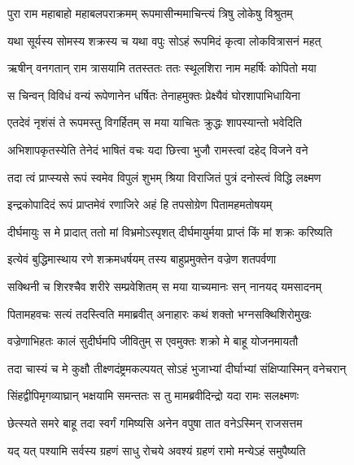 
\twolineshloka
{पुरा राम महाबाहो महाबलपराक्रमम्}
{रूपमासीन्ममाचिन्त्यं त्रिषु लोकेषु विश्रुतम्} %

\twolineshloka
{यथा सूर्यस्य सोमस्य शक्रस्य च यथा वपुः}
{सोऽहं रूपमिदं कृत्वा लोकवित्रासनं महत्} %

\twolineshloka
{ऋषीन् वनगतान् राम त्रासयामि ततस्ततः}
{ततः स्थूलशिरा नाम महर्षिः कोपितो मया} %

\twolineshloka
{स चिन्वन् विविधं वन्यं रूपेणानेन धर्षितः}
{तेनाहमुक्तः प्रेक्ष्यैवं घोरशापाभिधायिना} %

\twolineshloka
{एतदेवं नृशंसं ते रूपमस्तु विगर्हितम्}
{स मया याचितः क्रुद्धः शापस्यान्तो भवेदिति} %

\twolineshloka
{अभिशापकृतस्येति तेनेदं भाषितं वचः}
{यदा छित्त्वा भुजौ रामस्त्वां दहेद् विजने वने} %

\twolineshloka
{तदा त्वं प्राप्स्यसे रूपं स्वमेव विपुलं शुभम्}
{श्रिया विराजितं पुत्रं दनोस्त्वं विद्धि लक्ष्मण} %

\twolineshloka
{इन्द्रकोपादिदं रूपं प्राप्तमेवं रणाजिरे}
{अहं हि तपसोग्रेण पितामहमतोषयम्} %

\twolineshloka
{दीर्घमायुः स मे प्रादात् ततो मां विभ्रमोऽस्पृशत्}
{दीर्घमायुर्मया प्राप्तं किं मां शक्रः करिष्यति} %

\twolineshloka
{इत्येवं बुद्धिमास्थाय रणे शक्रमधर्षयम्}
{तस्य बाहुप्रमुक्तेन वज्रेण शतपर्वणा} %

\twolineshloka
{सक्थिनी च शिरश्चैव शरीरे सम्प्रवेशितम्}
{स मया याच्यमानः सन् नानयद् यमसादनम्} %

\twolineshloka
{पितामहवचः सत्यं तदस्त्विति ममाब्रवीत्}
{अनाहारः कथं शक्तो भग्नसक्थिशिरोमुखः} %

\twolineshloka
{वज्रेणाभिहतः कालं सुदीर्घमपि जीवितुम्}
{स एवमुक्तः शक्रो मे बाहू योजनमायतौ} %

\twolineshloka
{तदा चास्यं च मे कुक्षौ तीक्ष्णदंष्ट्रमकल्पयत्}
{सोऽहं भुजाभ्यां दीर्घाभ्यां संक्षिप्यास्मिन् वनेचरान्} %

\twolineshloka
{सिंहद्वीपिमृगव्याघ्रान् भक्षयामि समन्ततः}
{स तु मामब्रवीदिन्द्रो यदा रामः सलक्ष्मणः} %

\twolineshloka
{छेत्स्यते समरे बाहू तदा स्वर्गं गमिष्यसि}
{अनेन वपुषा तात वनेऽस्मिन् राजसत्तम} %

\twolineshloka
{यद् यत् पश्यामि सर्वस्य ग्रहणं साधु रोचये}
{अवश्यं ग्रहणं रामो मन्येऽहं समुपैष्यति} %


